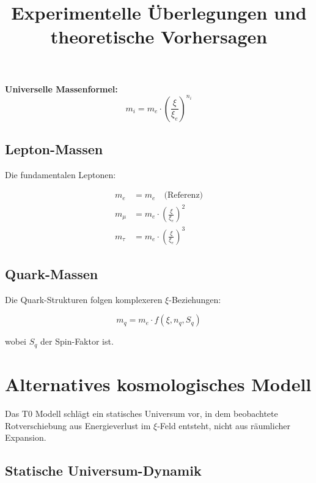 \documentclass[12pt,a4paper]{report}
\begin{document}
	\begin{formel}
		\textbf{Universelle Massenformel:}
		\begin{equation}
			m_i = m_e \cdot \left(\frac{\xi}{\xi_e}\right)^{n_i}
		\end{equation}
	\end{formel}
	
	\subsection{Lepton-Massen}
	
	Die fundamentalen Leptonen:
	
	\begin{align}
		m_e &= m_e \quad \text{(Referenz)} \\
		m_\mu &= m_e \cdot \left(\frac{\xi}{\xi_e}\right)^2 \\
		m_\tau &= m_e \cdot \left(\frac{\xi}{\xi_e}\right)^3
	\end{align}
	
	\subsection{Quark-Massen}
	
	Die Quark-Strukturen folgen komplexeren $\xi$-Beziehungen:
	
	\begin{equation}
		m_q = m_e \cdot f(\xi, n_q, S_q)
	\end{equation}
	
	wobei $S_q$ der Spin-Faktor ist.
	
	\title{Experimentelle Überlegungen und theoretische Vorhersagen}
\maketitle
	

	\section{Alternatives kosmologisches Modell}
	
	\begin{revolutionaer}
		Das T0 Modell schlägt ein statisches Universum vor, in dem beobachtete Rotverschiebung aus Energieverlust im $\xi$-Feld entsteht, nicht aus räumlicher Expansion.
	\end{revolutionaer}
	
	\subsection{Statische Universum-Dynamik}
	
\end{document}
